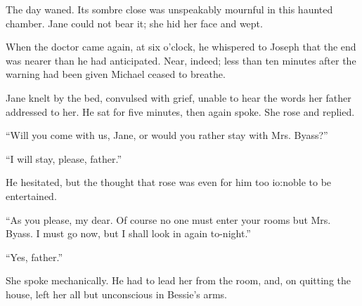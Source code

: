 The day waned. Its sombre close was
{\protect\hypertarget{169}{}{}}unspeakably mournful in this haunted
chamber. Jane could not bear it; she hid her face and wept.

When the doctor came again, at six o'clock, he whispered to Joseph that
the end was nearer than he had anticipated. Near, indeed; less than ten
minutes after the warning had been given Michael ceased to breathe.

Jane knelt by the bed, convulsed with grief, unable to hear the words
her father addressed to her. He sat for five minutes, then again spoke.
She rose and replied.

``Will you come with us, Jane, or would you rather stay with Mrs.
Byass?''

``I will stay, please, father.''

He hesitated, but the thought that rose was even for him too io:noble to
be entertained.

``As you please, my dear. Of course no one must enter your rooms but
Mrs. Byass. I must go now, but I shall look in again to-night.''

``Yes, father.''

She spoke mechanically. He had to lead her from the room, and, on
quitting the house, left her all but unconscious in Bessie's arms.
